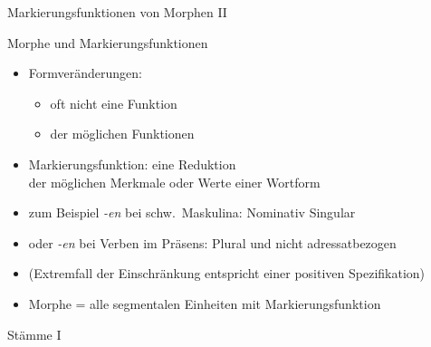 \begin{frame}
  {Markierungsfunktionen von Morphen II}
  \pause
  \begin{exe}
    \ex
    \begin{xlist}
    \end{xlist}
  \end{exe}
\end{frame}

\begin{frame}
  {Morphe und Markierungsfunktionen}
  \pause
  \begin{itemize}[<+->]
    \item Formveränderungen:
      \begin{itemize}[<+->]
        \item oft nicht \alert{eine} Funktion
        \item {} der möglichen Funktionen
      \end{itemize}
   \Halbzeile 
    \item \alert{Markierungsfunktion}: eine \alert{Reduktion}\\
      der möglichen Merkmale oder Werte einer Wortform
    \item zum Beispiel \textit{-en} bei schw.\ Maskulina:  Nominativ Singular
    \item oder \textit{-en} bei Verben im Präsens: Plural und nicht adressatbezogen
      \Halbzeile
    \item (Extremfall der Einschränkung entspricht einer positiven Spezifikation)
      \Halbzeile
    \item \alert{Morphe = alle segmentalen Einheiten mit Markierungsfunktion}
  \end{itemize}
\end{frame}

\begin{frame}
  {Stämme I}
  \pause
  \begin{exe}
    \ex
    \begin{xlist}
        \pause
        \pause
    \end{xlist}
  \end{exe}
\end{frame}

